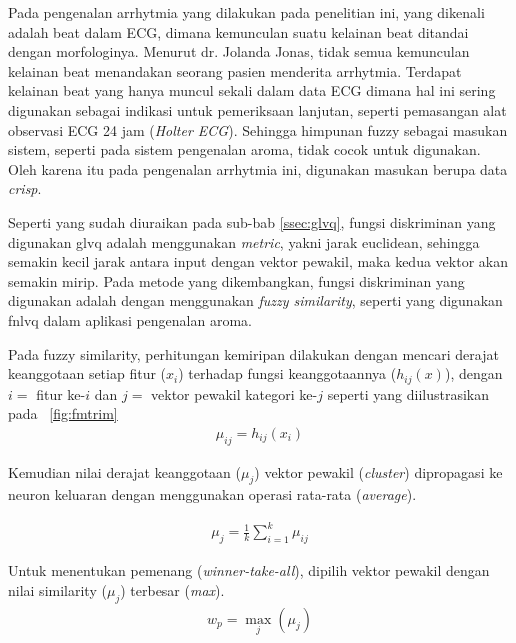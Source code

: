 
Pada pengenalan arrhytmia yang dilakukan pada penelitian ini, yang dikenali
adalah beat dalam ECG, dimana kemunculan suatu kelainan beat ditandai dengan
morfologinya. Menurut dr. Jolanda Jonas, tidak semua kemunculan kelainan beat
menandakan seorang pasien menderita arrhytmia. Terdapat kelainan beat yang hanya muncul
sekali dalam data ECG dimana hal ini sering digunakan sebagai indikasi untuk
pemeriksaan lanjutan, seperti pemasangan alat observasi ECG 24 jam
(\emph{Holter ECG}). Sehingga himpunan fuzzy sebagai masukan
sistem, seperti pada sistem pengenalan aroma, tidak cocok untuk digunakan. Oleh
karena itu pada pengenalan arrhytmia ini, digunakan masukan berupa data
\emph{crisp}.
 
Seperti yang sudah diuraikan pada sub-bab \ref{ssec:glvq}, fungsi
diskriminan yang digunakan \gls{glvq} adalah menggunakan \emph{\gls{metric}}, 
yakni jarak euclidean, sehingga semakin kecil jarak antara input dengan vektor
pewakil, maka kedua vektor akan semakin mirip. Pada metode yang dikembangkan,
fungsi diskriminan yang digunakan adalah dengan menggunakan \emph{fuzzy similarity},
seperti yang digunakan \gls{fnlvq} dalam aplikasi pengenalan aroma.


Pada fuzzy similarity, perhitungan kemiripan dilakukan dengan mencari derajat
keanggotaan setiap fitur ($x_i$) terhadap fungsi keanggotaannya ($h_{ij}(x)$), 
dengan $i=$ fitur ke-$i$ dan $j=$ vektor pewakil kategori ke-$j$ seperti yang
diilustrasikan pada \pic~\ref{fig:fmtrim}
\begin{align}
	\mu_{ij} = h_{ij}(x_i)
\end{align}

Kemudian nilai derajat keanggotaan ($\mu_{j}$) vektor pewakil
(\emph{cluster}) dipropagasi ke neuron keluaran dengan menggunakan operasi
rata-rata (\emph{average}).

\begin{align}
	\mu_j = \frac{1}{k} \sum_{i=1}^k \mu_{ij} 
\end{align}

Untuk menentukan pemenang (\emph{winner-take-all}), dipilih vektor
pewakil dengan nilai similarity ($\mu_j$) terbesar (\emph{max}).  
\begin{align}
	w_p = \max_j ( \mu_j )
\end{align}

